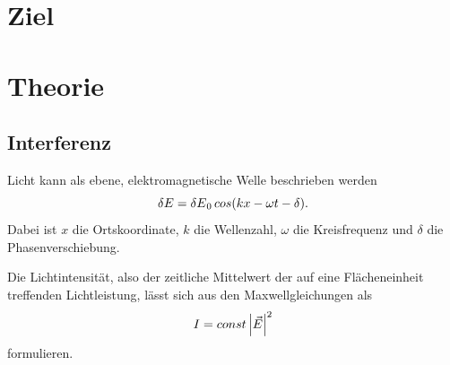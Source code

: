 \section{Ziel}

\section{Theorie}
\label{sec:Theorie}

\subsection{Interferenz} %
Licht kann als ebene, elektromagnetische Welle beschrieben werden
\begin{equation*}
    \var{E}= \var{E}_0 cos(kx - \omega t - \delta).
    \label{eqn:efeld}
\end{equation*}
Dabei ist $x$ die Ortskoordinate, $k$ die Wellenzahl, $\omega$ die Kreisfrequenz und $\delta$ 
die Phasenverschiebung. 


\noindent Die Lichtintensität, also der zeitliche Mittelwert der auf eine Flächeneinheit 
treffenden Lichtleistung, lässt sich aus den Maxwellgleichungen als
\begin{equation}
    I = const \, \abs{\vec{E}}^{2}
    \label{eqn:intensität}
\end{equation} 
formulieren.


